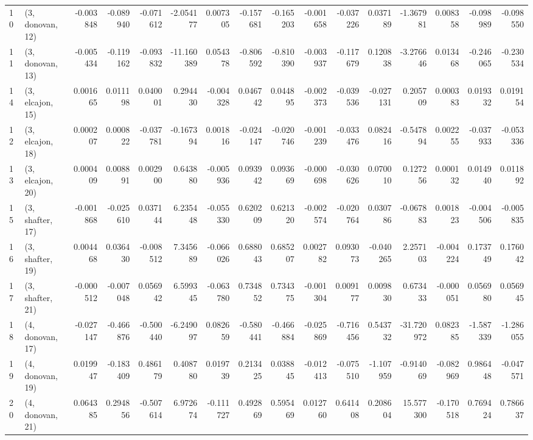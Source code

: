 \begin{tabular}{llrrrrrrrrrrrrrr}
10 &  (3, donovan, 12) &  -0.003848 & -0.089940 & -0.071612 &  -2.054177 &  0.007305 &  -0.157681 & -0.165203 & -0.001658 & -0.037226 &  0.037189 &  -1.367981 &  0.008358 & -0.098989 & -0.098550 \\
11 &  (3, donovan, 13) &  -0.005434 & -0.119162 & -0.093832 & -11.160389 &  0.054378 &  -0.806592 & -0.810390 & -0.003937 & -0.117679 &  0.120838 &  -3.276646 &  0.013468 & -0.246065 & -0.230534 \\
14 &  (3, elcajon, 15) &   0.001665 &  0.011198 &  0.040001 &   0.294430 & -0.004328 &   0.046742 &  0.044895 & -0.002373 & -0.039536 & -0.027131 &   0.205709 &  0.000383 &  0.019332 &  0.019154 \\
12 &  (3, elcajon, 18) &   0.000207 &  0.000822 & -0.037781 &  -0.167394 &  0.001816 &  -0.024147 & -0.020746 & -0.001239 & -0.033476 &  0.082416 &  -0.547894 &  0.002255 & -0.037933 & -0.053336 \\
13 &  (3, elcajon, 20) &   0.000409 &  0.008891 &  0.002900 &   0.643880 & -0.005936 &   0.093942 &  0.093669 & -0.000698 & -0.030626 &  0.070010 &   0.127256 &  0.000132 &  0.014940 &  0.011892 \\
15 &  (3, shafter, 17) &  -0.001868 & -0.025610 &  0.037144 &   6.235448 & -0.055330 &   0.620209 &  0.621320 & -0.002574 & -0.020764 &  0.030786 &  -0.067883 &  0.001823 & -0.004506 & -0.005835 \\
16 &  (3, shafter, 19) &   0.004468 &  0.036430 & -0.008512 &   7.345689 & -0.066026 &   0.688043 &  0.685207 &  0.002782 &  0.093073 & -0.040265 &   2.257103 & -0.004224 &  0.173749 &  0.176042 \\
17 &  (3, shafter, 21) &  -0.000512 & -0.007048 &  0.056942 &   6.599345 & -0.063780 &   0.734852 &  0.734375 & -0.001304 &  0.009177 &  0.009830 &   0.673433 & -0.000051 &  0.056980 &  0.056945 \\
18 &  (4, donovan, 17) &  -0.027147 & -0.466876 & -0.500440 &  -6.249097 &  0.082659 &  -0.580441 & -0.466884 & -0.025869 & -0.716456 &  0.543732 & -31.720972 &  0.082385 & -1.587339 & -1.286055 \\
19 &  (4, donovan, 19) &   0.019947 & -0.183409 &  0.486179 &   0.408780 &  0.019739 &   0.213425 &  0.038845 & -0.012413 & -0.075510 & -1.107959 &  -0.914069 & -0.082969 &  0.986448 & -0.047571 \\
20 &  (4, donovan, 21) &   0.064385 &  0.294856 & -0.507614 &   6.972674 & -0.111727 &   0.492869 &  0.595469 &  0.012760 &  0.641408 &  0.208604 &  15.577300 & -0.170518 &  0.769424 &  0.786637 \\

\end{tabular}
